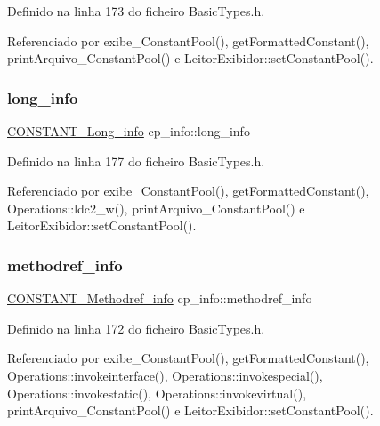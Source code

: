 Definido na linha 173 do ficheiro Basic\+Types.\+h.



Referenciado por exibe\+\_\+\+Constant\+Pool(), get\+Formatted\+Constant(), print\+Arquivo\+\_\+\+Constant\+Pool() e Leitor\+Exibidor\+::set\+Constant\+Pool().

\mbox{\label{structcp__info_ab0a2bfb802609dbdb4985cb55f465e6f}} 
\subsubsection{\texorpdfstring{long\+\_\+info}{long\_info}}
{\footnotesize\ttfamily \hyperlink{structCONSTANT__Long__info}{C\+O\+N\+S\+T\+A\+N\+T\+\_\+\+Long\+\_\+info} cp\+\_\+info\+::long\+\_\+info}



Definido na linha 177 do ficheiro Basic\+Types.\+h.



Referenciado por exibe\+\_\+\+Constant\+Pool(), get\+Formatted\+Constant(), Operations\+::ldc2\+\_\+w(), print\+Arquivo\+\_\+\+Constant\+Pool() e Leitor\+Exibidor\+::set\+Constant\+Pool().

\mbox{\label{structcp__info_ab1304804bef6a0fe6575671223d7d689}} 
\subsubsection{\texorpdfstring{methodref\+\_\+info}{methodref\_info}}
{\footnotesize\ttfamily \hyperlink{structCONSTANT__Methodref__info}{C\+O\+N\+S\+T\+A\+N\+T\+\_\+\+Methodref\+\_\+info} cp\+\_\+info\+::methodref\+\_\+info}



Definido na linha 172 do ficheiro Basic\+Types.\+h.



Referenciado por exibe\+\_\+\+Constant\+Pool(), get\+Formatted\+Constant(), Operations\+::invokeinterface(), Operations\+::invokespecial(), Operations\+::invokestatic(), Operations\+::invokevirtual(), print\+Arquivo\+\_\+\+Constant\+Pool() e Leitor\+Exibidor\+::set\+Constant\+Pool().

